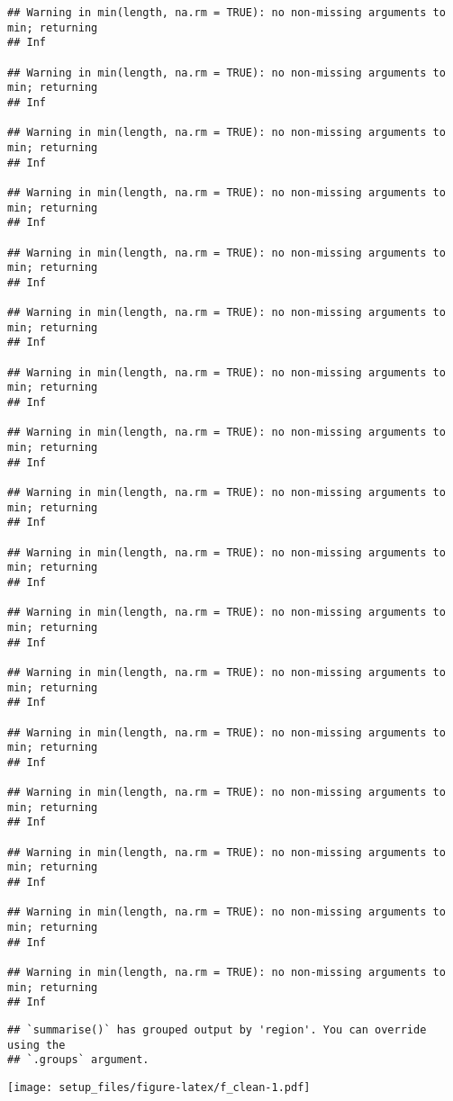 \documentclass[
]{article}
\begin{document}
\begin{verbatim}
## Warning in min(length, na.rm = TRUE): no non-missing arguments to min; returning
## Inf

## Warning in min(length, na.rm = TRUE): no non-missing arguments to min; returning
## Inf

## Warning in min(length, na.rm = TRUE): no non-missing arguments to min; returning
## Inf

## Warning in min(length, na.rm = TRUE): no non-missing arguments to min; returning
## Inf

## Warning in min(length, na.rm = TRUE): no non-missing arguments to min; returning
## Inf

## Warning in min(length, na.rm = TRUE): no non-missing arguments to min; returning
## Inf

## Warning in min(length, na.rm = TRUE): no non-missing arguments to min; returning
## Inf

## Warning in min(length, na.rm = TRUE): no non-missing arguments to min; returning
## Inf

## Warning in min(length, na.rm = TRUE): no non-missing arguments to min; returning
## Inf

## Warning in min(length, na.rm = TRUE): no non-missing arguments to min; returning
## Inf

## Warning in min(length, na.rm = TRUE): no non-missing arguments to min; returning
## Inf

## Warning in min(length, na.rm = TRUE): no non-missing arguments to min; returning
## Inf

## Warning in min(length, na.rm = TRUE): no non-missing arguments to min; returning
## Inf

## Warning in min(length, na.rm = TRUE): no non-missing arguments to min; returning
## Inf

## Warning in min(length, na.rm = TRUE): no non-missing arguments to min; returning
## Inf

## Warning in min(length, na.rm = TRUE): no non-missing arguments to min; returning
## Inf

## Warning in min(length, na.rm = TRUE): no non-missing arguments to min; returning
## Inf
\end{verbatim}

\begin{verbatim}
## `summarise()` has grouped output by 'region'. You can override using the
## `.groups` argument.
\end{verbatim}

\texttt{[image: setup\_files/figure-latex/f\_clean-1.pdf]}
\end{document}
